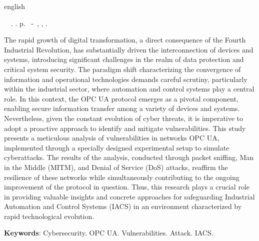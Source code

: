 \begin{resumo}[Abstract]
 \begin{otherlanguage*}{english}
	\begin{flushleft} 
		\setlength{\absparsep}{0pt} %
 		\SingleSpacing  		\imprimirautorabr~~\textbf{\imprimirtitleabstract}.	\imprimirdata.  \pageref{LastPage}p. 
		\imprimirtipotrabalhoabs~-~\imprimirinstituicao, \imprimirlocal, 	\imprimirdata. 
 	\end{flushleft}
	\OnehalfSpacing 
   The rapid growth of digital transformation, a direct consequence of the Fourth Industrial Revolution, has substantially driven the interconnection of devices and systems, introducing significant challenges in the realm of data protection and critical system security. The paradigm shift characterizing the convergence of information and operational technologies demands careful scrutiny, particularly within the industrial sector, where automation and control systems play a central role. In this context, the OPC UA protocol emerges as a pivotal component, enabling secure information transfer among a variety of devices and systems. Nevertheless, given the constant evolution of cyber threats, it is imperative to adopt a proactive approach to identify and mitigate vulnerabilities. This study presents a meticulous analysis of vulnerabilities in networks OPC UA, implemented through a specially designed experimental setup to simulate cyberattacks. The results of the analysis, conducted through packet sniffing, Man in the Middle (MITM), and Denial of Service (DoS) attacks, reaffirm the resilience of these networks while simultaneously contributing to the ongoing improvement of the protocol in question. Thus, this research plays a crucial role in providing valuable insights and concrete approaches for safeguarding Industrial Automation and Control Systems (IACS) in an environment characterized by rapid technological evolution.

   \vspace{\onelineskip}
 
   \noindent 
   \textbf{Keywords}: Cybersecurity. OPC UA. Vulnerabilities. Attack. IACS.
 \end{otherlanguage*}
\end{resumo}
